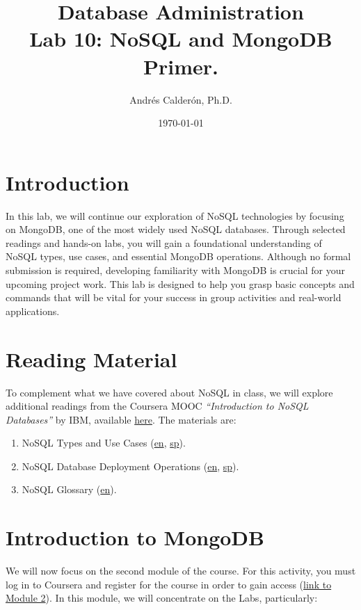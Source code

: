 \documentclass{article}
\title{Database Administration \\ Lab 10: NoSQL and MongoDB Primer.}
\author{Andrés Calderón, Ph.D.}
\date{\today}
\begin{document}
\maketitle

\section{Introduction}
In this lab, we will continue our exploration of NoSQL technologies by focusing on MongoDB, one of the most widely used NoSQL databases. Through selected readings and hands-on labs, you will gain a foundational understanding of NoSQL types, use cases, and essential MongoDB operations. Although no formal submission is required, developing familiarity with MongoDB is crucial for your upcoming project work. This lab is designed to help you grasp basic concepts and commands that will be vital for your success in group activities and real-world applications.

\section{Reading Material}
To complement what we have covered about NoSQL in class, we will explore additional readings from the Coursera MOOC \textit{``Introduction to NoSQL Databases''} by IBM, available \href{https://www.coursera.org/learn/introduction-to-nosql-databases}{here}. The materials are:

\begin{enumerate}
    \item NoSQL Types and Use Cases (\href{https://drive.google.com/file/d/1dgG_1JSRWCmeIBABfW83ykd6I1L0tCJJ/view?usp=sharing}{en}, \href{https://drive.google.com/file/d/1rqhSVxo7ci1MEieJIbGGbL3s-qxI1Ltr/view?usp=sharing}{sp}).
    \item NoSQL Database Deployment Operations (\href{https://drive.google.com/file/d/11wvBhvxNRG0HttqZ9p_SgdIaQMlDE9nt/view?usp=sharing}{en}, \href{https://drive.google.com/file/d/1gMjSwO69xOUUbY7pJ_Rs10uJ15oQYUUA/view?usp=sharing}{sp}).
    \item NoSQL Glossary (\href{https://drive.google.com/file/d/1XmvBUvBvYdzN6l4gS-Q6eavlJZm6m4DH/view?usp=sharing}{en}).
\end{enumerate}

\section{Introduction to MongoDB}
We will now focus on the second module of the course. For this activity, you must log in to Coursera and register for the course in order to gain access (\href{https://www.coursera.org/learn/introduction-to-nosql-databases/home/module/2}{link to Module 2}). In this module, we will concentrate on the Labs, particularly:
\end{document}
